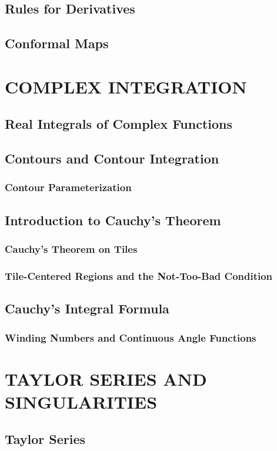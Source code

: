 \documentclass{refbook}
\begin{document}
\subsection{Rules for Derivatives}
\subsection{Conformal Maps}




\section{COMPLEX INTEGRATION}
\subsection{Real Integrals of Complex Functions}
\subsection{Contours and Contour Integration}
\subsubsection{Contour Parameterization}
\subsection{Introduction to Cauchy's Theorem}
\subsubsection{Cauchy's Theorem on Tiles}
\subsubsection{Tile-Centered Regions and the Not-Too-Bad Condition}
\subsection{Cauchy's
 Integral Formula}
\subsubsection{Winding Numbers and Continuous Angle Functions}

\section{TAYLOR SERIES AND SINGULARITIES}
\subsection
{Taylor Series}
\end{document}
